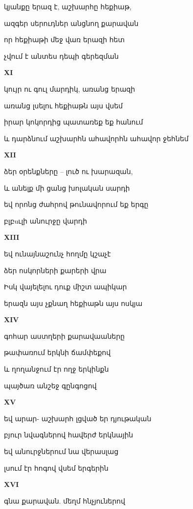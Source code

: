 կյանքը երազ է, աշխարհը հեքիաթ, 

 
ազգեր սերուդներ անցնող քարավան


որ հեքիաթի մեջ վառ երազի հետ


չվում է անտես դեպի գերեզման


\centerline {\bf XI}
 
կույր ու գուլ  մարդիկ, առանց երազի

առանց լսելու հեքիաթն  այս վսեմ


իրար կոկորդից պատառեք եք հանում


և դարձնում  աշխարհն ահավորհն ահավոր  ջեհնեմ
       

\centerline{\bf XII}


ձեր օրենքները -- լուծ ու խարազան,


և անելք մի ցանց խոլական սարդի


եվ որոնց  ժահրով թունավորում   եք  երգը 



բլբuւլի անուրջը վարդի




\centerline{\bf  XIII}

եվ  ունայնաշունչ հողմը կշաչէ


ձեր ոսկորների քարերի վրա


Իսկ վայելելու դուք միշտ ապիկար


երազն այս չքնաղ հեքիաթն այս ոսկյա



\centerline{\bf    XIV           }



գոհար աստղերի քարավաաները 


 թափառում երկնի ճամփեքով



և ղողանջում էր ողջ երկինքն


պայծառ անշեջ  գընգոցով





\centerline{\bf   XV }   


եվ արար- աշխարհ լցված եր դյութական 
                       


բյուր նվագներով հավերժ երկնային


եվ անուրջներում նա վերասլաց 



լսում էր հոգով վսեմ երգերին 


\centerline    {\bf  XVI}


գնա քարավան. մեղմ հնչյուներով



